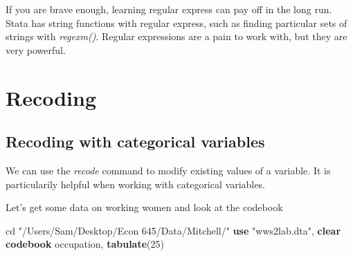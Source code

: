 \documentclass[
]{book}
\newenvironment{Shaded}{\begin{snugshade}}{\end{snugshade}}
\newcommand{\KeywordTok}[1]{\textcolor[rgb]{0.13,0.29,0.53}{\textbf{#1}}}
\newcommand{\NormalTok}[1]{#1}
\newcommand{\StringTok}[1]{\textcolor[rgb]{0.31,0.60,0.02}{#1}}
\begin{document}
If you are brave enough, learning regular express can pay off in the long run. Stata has string functions with regular express, such as finding particular sets of strings with \emph{regexm()}. Regular expressions are a pain to work with, but they are very powerful.

\section{Recoding}\label{recoding}

\subsection{Recoding with categorical variables}\label{recoding-with-categorical-variables}

We can use the \emph{recode} command to modify existing values of a variable. It is particularily helpful when working with categorical variables.

Let's get some data on working women and look at the codebook

\begin{Shaded}
\begin{Highlighting}[]
\NormalTok{cd }\StringTok{"/Users/Sam/Desktop/Econ 645/Data/Mitchell/"}
\KeywordTok{use} \StringTok{"wws2lab.dta"}\NormalTok{, }\KeywordTok{clear}
\KeywordTok{codebook}\NormalTok{ occupation, }\KeywordTok{tabulate}\NormalTok{(25)}
\end{Highlighting}
\end{Shaded}
\end{document}
